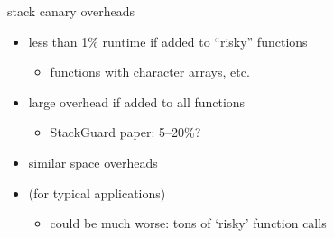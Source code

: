 
\begin{frame}{stack canary overheads}
    \begin{itemize}
    \item less than 1\% runtime if added to ``risky'' functions
        \begin{itemize}
        \item functions with character arrays, etc.
        \end{itemize}
    \item large overhead if added to all functions
        \begin{itemize}
        \item StackGuard paper: 5--20\%?
        \end{itemize}
    \item similar space overheads
    \vspace{.5cm}
    \item (for typical applications)
        \begin{itemize}
        \item could be much worse: tons of `risky' function calls
        \end{itemize}
    \end{itemize}
\end{frame}


